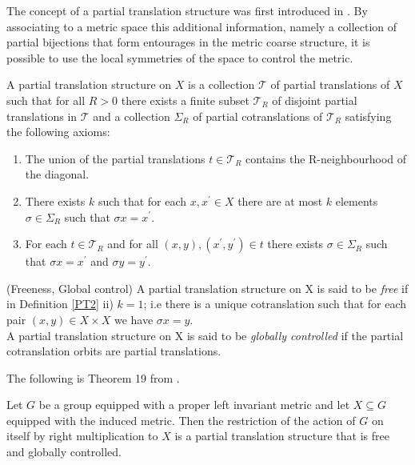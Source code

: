 \begin{corollary}
The concept of a partial translation structure was first introduced in \cite{MR2363428}. By associating to a metric space this additional information, namely a collection of partial bijections that form entourages in the metric coarse structure, it is possible to use the local symmetries of the space to control the metric. 


\begin{definition}\label{PT2}
A partial translation structure on $X$ is a collection $\mathcal{T}$ of partial translations of $X$ such that for all $R>0$ there exists a finite subset $\mathcal{T}_{R}$ of disjoint partial translations in $\mathcal{T}$ and a collection $\Sigma_{R}$ of partial cotranslations of $\mathcal{T}_{R}$ satisfying the following axioms:
\begin{enumerate}
\item The union of the partial translations  $t \in \mathcal{T}_{R}$ contains the R-neighbourhood of the diagonal.
\item There exists $k$ such that for each $x,x^{'} \in X$ there are at most $k$ elements $\sigma \in \Sigma_{R}$ such that $\sigma x=x^{'}$.
\item For each $t \in \mathcal{T}_{R}$ and for all $(x,y),(x^{'},y^{'}) \in t$ there exists $\sigma \in \Sigma_{R}$ such that $\sigma x=x^{'}$ and $\sigma y=y^{'}$.
\end{enumerate}
\end{definition}

\begin{definition}(Freeness, Global control)
A partial translation structure on X is said to be \textit{free} if in Definition \ref{PT2} ii) $k=1$; i.e there is a unique cotranslation such that for each pair $(x,y)\in X \times X$ we have $\sigma x = y$.\\
A partial translation structure on X is said to be \textit{globally controlled} if the partial cotranslation orbits are partial translations. 
\end{definition}

The following is Theorem 19 from \cite{MR2363428}.

\begin{lemma}\label{lem:L10}
Let $G$ be a group equipped with a proper left invariant metric and let $X \subseteq G$ equipped with the induced metric. Then the restriction of the action of $G$ on itself by right multiplication to $X$ is a partial translation structure that is free and globally controlled.
\end{lemma}


\end{corollary}
